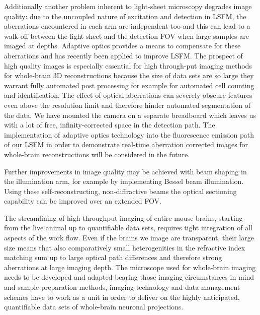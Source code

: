 \documentclass[12pt]{spieman}  %
\begin{document}
\begin{spacing}{2}
Additionally another problem inherent to light-sheet microscopy degrades image quality: due to the uncoupled nature of excitation and detection in LSFM, the aberrations encountered in each arm are independent too and this can lead to a walk-off between the light sheet and the detection FOV when large samples are imaged at depths. Adaptive optics\cite{Booth2007} provides a means to compensate for these aberrations and has recently been applied to improve LSFM\cite{Jorand2012}. The prospect of high quality images is especially essential for high through-put imaging methods for whole-brain 3D reconstructions because the size of data sets are so large they warrant fully automated post processing for example for automated cell counting and identification\cite{Frasconi2014}. The effect of optical aberrations can severely obscure features even above the resolution limit and therefore hinder automated segmentation of the data. We have mounted the camera on a separate breadboard which leaves us with a lot of free, infinity-corrected space in the detection path. The implementation of adaptive optics technology into the fluorescence emission path of our LSFM in order to demonstrate real-time aberration corrected images for whole-brain reconstructions will be considered in the future. 

Further improvements in image quality may be achieved with beam shaping in the illumination arm, for example by implementing Bessel beam illumination\cite{Fahrbach2010,Planchon2011,Gao2014}. Using these self-reconstructing, non-diffractive beams the optical sectioning capability can be improved over an extended FOV. 

The streamlining of high-throughput imaging of entire mouse brains, starting from the live animal up to quantifiable data sets, requires tight integration of all aspects of the work flow. Even if the brains we image are transparent, their large size means that also comparatively small heterogenities in the refractive index matching sum up to large optical path differences and therefore strong aberrations at large imaging depth. The microscope used for whole-brain imaging needs to be developed and adapted bearing those imaging circumstances in mind and sample preparation methods, imaging technology and data management schemes have to work as a unit in order to deliver on the highly anticipated, quantifiable data sets of whole-brain neuronal projections.


\end{spacing}
\end{document}
